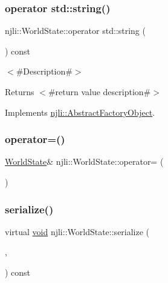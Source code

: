 \subsubsection{\texorpdfstring{operator std\+::string()}{operator std::string()}}
{\footnotesize\ttfamily njli\+::\+World\+State\+::operator std\+::string (\begin{DoxyParamCaption}{ }\end{DoxyParamCaption}) const\hspace{0.3cm}{\ttfamily [virtual]}}

$<$\#\+Description\#$>$

\begin{DoxyReturn}{Returns}
$<$\#return value description\#$>$ 
\end{DoxyReturn}


Implements \mbox{\hyperlink{classnjli_1_1_abstract_factory_object_a838f4fa7e65cace6098aab5222892942}{njli\+::\+Abstract\+Factory\+Object}}.

\mbox{\label{classnjli_1_1_world_state_a512bad5b9134e2e54361f6fadd3781ed}} 
\subsubsection{\texorpdfstring{operator=()}{operator=()}}
{\footnotesize\ttfamily \mbox{\hyperlink{classnjli_1_1_world_state}{World\+State}}\& njli\+::\+World\+State\+::operator= (\begin{DoxyParamCaption}\item[{const \mbox{\hyperlink{classnjli_1_1_world_state}{World\+State}} \&}]{ }\end{DoxyParamCaption})\hspace{0.3cm}{\ttfamily [protected]}}

\mbox{\label{classnjli_1_1_world_state_ae671bdd4b655e47482bc5d418e51b097}} 
\subsubsection{\texorpdfstring{serialize()}{serialize()}}
{\footnotesize\ttfamily virtual \mbox{\hyperlink{_thread_8h_af1e856da2e658414cb2456cb6f7ebc66}{void}} njli\+::\+World\+State\+::serialize (\begin{DoxyParamCaption}\item[{\mbox{\hyperlink{_thread_8h_af1e856da2e658414cb2456cb6f7ebc66}{void}} $\ast$}]{,  }\item[{bt\+Serializer $\ast$}]{ }\end{DoxyParamCaption}) const\hspace{0.3cm}{\ttfamily [virtual]}}

